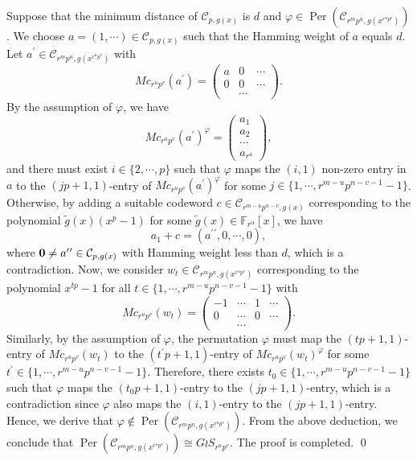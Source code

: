 \documentclass[journal,12pt,onecolumn]{IEEEtran}
\begin{document}
    Suppose that the minimum distance of $\mathcal{C}_{p,g(x)}$ is $d$ and $\varphi\in \operatorname{Per}(\mathcal{C}_{r^mp^n,g(x^{r^up^v})})$. We choose $a = (1,\cdots)\in\mathcal{C}_{p,g(x)}$ such that the Hamming weight of $a$ equals $d$. Let $a^\prime\in\mathcal{C}_{r^mp^n,g(x^{r^up^v})}$ with
        \[
            Mc_{r^up^v}(a^\prime) = \begin{pmatrix}
                a & 0 & \cdots  \\
                0 & 0 & \cdots \\
                  & \cdots & 
            \end{pmatrix}. 
        \]
        By the assumption of $\varphi$, we have
        \[
            Mc_{r^up^v}(a^\prime)^\varphi = \begin{pmatrix}
                a_1 \\
                a_2 \\
                \cdots \\
                a_{r^u}
            \end{pmatrix},
        \]
        and there must exist $i\in \{2,\cdots,p\}$ such that $\varphi$ maps the $(i,1)$ non-zero entry in $a$ to the $(jp+1,1)$-entry of $Mc_{r^up^v}(a^\prime)^\varphi$ for some $j\in\{1,\cdots,r^{m-u}p^{n-v-1}-1\}$. Otherwise, by adding a suitable codeword $c\in\mathcal{C}_{r^{m-u}p^{n-v},g(x)}$ corresponding to the polynomial $\tilde{g}(x)(x^p-1)$ for some $\tilde{g}(x)\in \mathbb{F}_{r^\alpha}[x]$, we have
        \[
            a_1 + c = (a^\prime{}^\prime,0,\cdots,0),
        \]
        where ${\bf 0}\neq a^\prime{}^\prime \in \mathcal{C}_{p,g(x)}$ with Hamming weight less than $d$, which is a contradiction. Now, we consider $w_t\in\mathcal{C}_{r^mp^n,g(x^{r^up^v})}$ corresponding to the polynomial $x^{tp}-1$ for all $t\in\{1,\cdots,r^{m-u}p^{n-v-1}-1\}$ with
        \[
            Mc_{r^up^v}(w_t) = \begin{pmatrix}
                -1 & \cdots & 1 & \cdots \\
                0 & \cdots & 0 & \cdots \\
                  & \cdots &  & 
            \end{pmatrix}.
        \]
        Similarly, by the assumption of $\varphi$, the permutation $\varphi$ must map the $(tp + 1,1)$-entry of $Mc_{r^up^v}(w_t)$ to the $(t^\prime p+1,1)$-entry of $Mc_{r^up^v}(w_t)^\varphi$ for some $t^\prime\in\{1,\cdots,r^{m-u}p^{n-v-1}-1\}$. Therefore, there exists $t_0\in\{1,\cdots,r^{m-u}p^{n-v-1}-1\}$ such that $\varphi$ maps the $(t_0p + 1,1)$-entry to the $(jp+1,1)$-entry, which is a contradiction since $\varphi$ also maps the $(i,1)$-entry to the $(jp+1,1)$-entry. Hence, we derive that $\varphi\notin \operatorname{Per}(\mathcal{C}_{r^mp^n,g(x^{r^up^v})})$. From the above deduction, we conclude that $\operatorname{Per}(\mathcal{C}_{r^mp^n,g(x^{r^up^v})})\cong G \wr S_{r^up^v}$. The proof is completed. \qed
\end{document}
